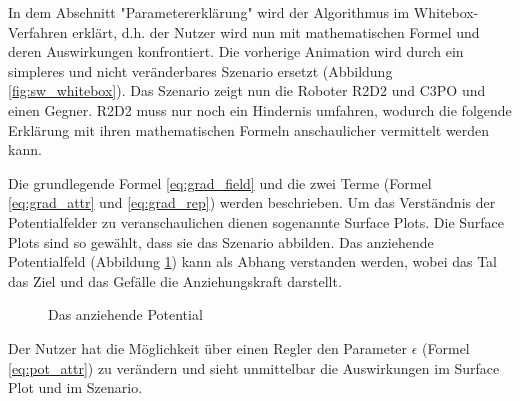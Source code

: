 In dem Abschnitt "Parametererklärung" wird der Algorithmus im Whitebox-Verfahren erklärt, d.h. der Nutzer wird nun mit mathematischen Formel und deren Auswirkungen konfrontiert. Die vorherige Animation wird durch ein simpleres und nicht veränderbares Szenario ersetzt (Abbildung \ref{fig:sw_whitebox}). 
Das Szenario zeigt nun die Roboter R2D2 und C3PO und einen Gegner. R2D2 muss nur noch ein Hindernis umfahren, wodurch die folgende Erklärung mit ihren mathematischen Formeln anschaulicher vermittelt werden kann.

Die grundlegende Formel \ref{eq:grad_field} und die zwei Terme (Formel \ref{eq:grad_attr} und \ref{eq:grad_rep}) werden beschrieben.
Um das Verständnis der Potentialfelder zu veranschaulichen dienen sogenannte Surface Plots. Die Surface Plots sind so gewählt, dass sie das Szenario abbilden. Das anziehende Potentialfeld (Abbildung \ref{fig:surf_attr}) kann als Abhang verstanden werden, wobei das Tal das Ziel und das Gefälle die Anziehungskraft darstellt.
\begin{figure}[h!]
  \centering
  \caption{Das anziehende Potential}
  \label{fig:surf_attr}
\end{figure}
Der Nutzer hat die Möglichkeit über einen Regler den Parameter $\epsilon$ (Formel \ref{eq:pot_attr}) zu verändern und sieht unmittelbar die Auswirkungen im Surface Plot und im Szenario. 
